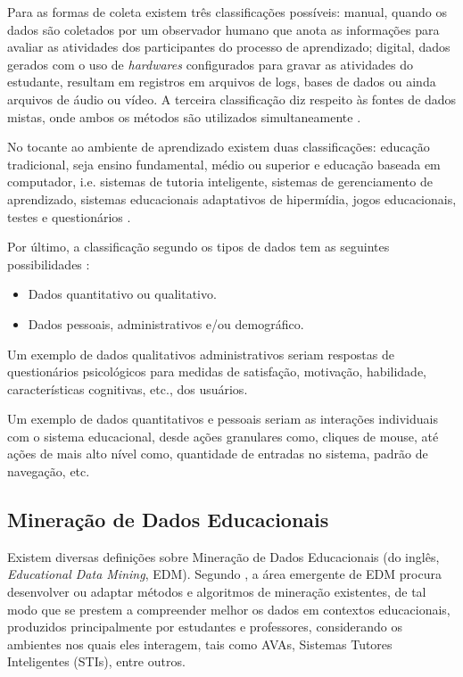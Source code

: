 Para as formas de coleta existem três classificações possíveis: manual, quando
os dados são coletados por um observador humano que anota as informações para
avaliar as atividades dos participantes do processo de aprendizado; digital,
dados gerados com o uso de \textit{hardwares} configurados para gravar as
atividades do estudante, resultam em registros em arquivos de logs, bases de
dados ou ainda arquivos de áudio ou vídeo. A terceira classificação diz respeito
às fontes de dados mistas, onde ambos os métodos são utilizados simultaneamente
\cite{bousbia2014contribution}.

No tocante ao ambiente de aprendizado existem duas classificações: educação
tradicional, seja ensino fundamental, médio ou superior e educação baseada em
computador, i.e. sistemas de tutoria inteligente, sistemas de gerenciamento de
aprendizado, sistemas educacionais adaptativos de hipermídia, jogos
educacionais, testes e questionários \cite{romero2013data}.

Por último, a classificação segundo os tipos de dados tem as seguintes
possibilidades \cite{bousbia2014contribution}:
\begin{itemize}
  \item Dados quantitativo ou qualitativo.
  \item Dados pessoais, administrativos e/ou demográfico.
\end{itemize}

Um exemplo de dados qualitativos administrativos seriam respostas de
questionários psicológicos para medidas de satisfação, motivação, habilidade,
características cognitivas, etc., dos usuários.

Um exemplo de dados quantitativos e pessoais seriam as interações individuais
com o sistema educacional, desde ações granulares como, cliques de mouse, até
ações de mais alto nível como, quantidade de entradas no sistema, padrão de
navegação, etc.

\subsection{Mineração de Dados Educacionais}

Existem diversas definições sobre Mineração de Dados Educacionais (do inglês,
\textit{Educational Data Mining}, EDM). Segundo
, a área emergente de EDM procura desenvolver ou
adaptar métodos e algoritmos de mineração existentes, de tal modo que se prestem
a compreender melhor os dados em contextos educacionais, produzidos
principalmente por estudantes e professores, considerando os ambientes nos quais
eles interagem, tais como AVAs, Sistemas Tutores Inteligentes (STIs), entre
outros.

